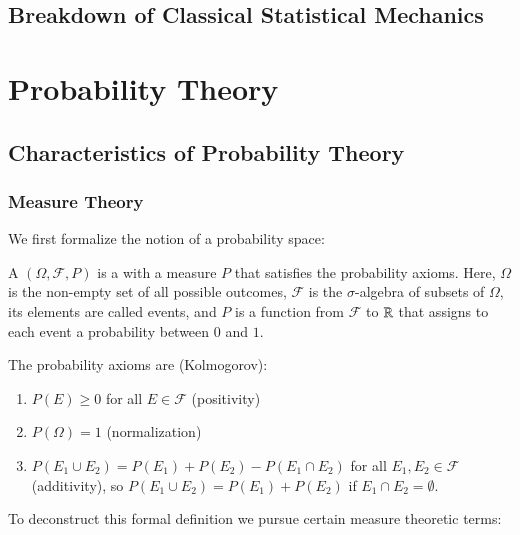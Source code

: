 \documentclass[12pt, a4paper, oneside, openright, titlepage]{book}
\begin{document}
\chapter{Breakdown of Classical Statistical Mechanics}



\part{Probability Theory}


\chapter{Characteristics of Probability Theory}

\section{Measure Theory}

We first formalize the notion of a probability space:

\begin{defn}
    A  $(\Omega, \mathcal{F}, P)$ is a  with a measure $P$ that satisfies the probability axioms. Here, $\Omega$ is the non-empty set of all possible outcomes, $\mathcal{F}$ is the $\sigma$-algebra of subsets of $\Omega$, its elements are called events, and $P$ is a function from $\mathcal{F}$ to $\mathbb R$ that assigns to each event a probability between $0$ and $1$.

    The probability axioms are (Kolmogorov):
    \begin{enumerate}
        \item $P(E) \geq 0$ for all $E \in \mathcal{F}$ (positivity)
        \item $P(\Omega) = 1$ (normalization)
        \item $P(E_1\cup E_2) = P(E_1) + P(E_2) - P(E_1\cap E_2)$ for all $E_1,E_2 \in \mathcal{F}$ (additivity), so $P(E_1\cup E_2) = P(E_1)+P(E_2)$ if $E_1\cap E_2 = \emptyset$.
    \end{enumerate}
\end{defn}

To deconstruct this formal definition we pursue certain measure theoretic terms:
\end{document}
